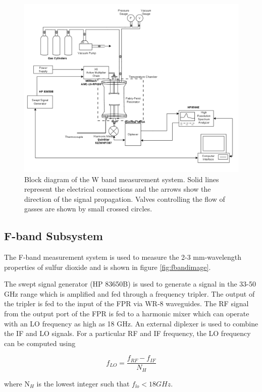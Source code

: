 \begin{figure}[H]
    \centering
	\includegraphics[width=1\textwidth]{./images/w-bandsystem.png}
	\caption{Block diagram of the W band measurement system. Solid lines represent the electrical connections and the arrows show the direction of the signal propagation. Valves controlling the flow of gasses are shown by small crossed circles.}
    \label{fig:wbandimage}
\end{figure}


\subsection{F-band Subsystem}
The F-band measurement system is used to measure the 2-3 mm-wavelength properties of sulfur dioxide and is shown in figure \ref{fig:fbandimage}.

The swept signal generator (HP 83650B) is used to generate a signal in the 33-50 GHz range which
is amplified and fed through a frequency tripler. The output of the tripler is fed to the input of the FPR via WR-8 waveguides. The RF signal from the output port of the FPR is fed to a harmonic mixer which can operate with an LO frequency as high as 18 GHz. An external diplexer is used to combine the IF and LO signals. For a particular RF and IF frequency,  the LO frequency can be computed using

\begin{equation} \label{eq:fbandlo}
f_{LO} = \frac{f_{RF} - f_{IF}}{N_H	}
\end{equation}

\noindent where N$_H$ is the lowest integer such that $f_{lo} < 18 GHz$.

